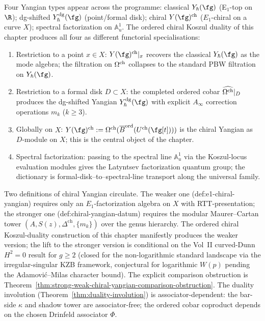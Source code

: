 \begin{convention}
\label{conv:ordered-kd-core-yangian-types}
Four Yangian types appear across the programme: classical
$Y_\hbar(\fg)$ (E$_1$-top on $\R$); dg-shifted
$Y^{\mathrm{dg}}_\hbar(\fg)$ (point/formal disk); chiral
$Y(\fg)^{\mathrm{ch}}$ ($E_1$-chiral on a curve $X$); spectral
factorization on $\mathbb{A}^1_u$. The ordered chiral Koszul
duality of this chapter produces all four as different functorial
specialisations:
\begin{enumerate}[label=\textup{(\arabic*)}]
\item Restriction to a point $x\in X$: $Y(\fg)^{\mathrm{ch}}|_x$
recovers the classical $Y_\hbar(\fg)$ as the mode algebra; the
filtration on $\Omega^{\mathrm{ch}}$ collapses to the standard PBW filtration
on $Y_\hbar(\fg)$.
\item Restriction to a formal disk $D\subset X$: the completed
ordered cobar $\widehat{\Omega^{\mathrm{ch}}}|_D$ produces the dg-shifted
Yangian $Y^{\mathrm{dg}}_\hbar(\fg)$ with explicit $A_\infty$
correction operations $m_k$ ($k\ge 3$).
\item Globally on $X$: $Y(\fg)^{\mathrm{ch}} :=
\Cobar(\Barchord(U^{\mathrm{ch}}(\fg[t])))$ is the chiral
Yangian as $D$-module on $X$; this is the central object of the
chapter.
\item Spectral factorization: passing to the spectral line
$\mathbb{A}^1_u$ via the Koszul-locus evaluation modules gives the
Latyntsev factorization quantum group; the dictionary is
formal-disk--to--spectral-line transport along the universal
family.
\end{enumerate}
\end{convention}

\begin{remark}
\label{rem:ordered-kd-core-two-definitions}
Two definitions of chiral Yangian circulate. The weaker one
(def:e1-chiral-yangian) requires only an $E_1$-factorization
algebra on $X$ with RTT-presentation; the stronger one
(def:chiral-yangian-datum) requires the modular Maurer--Cartan
tower $(A, S(z), \Delta^{\mathrm{ch}}, \{m_k\})$ over the genus
hierarchy. The ordered chiral Koszul-duality construction of this
chapter manifestly produces the weaker version; the lift to the
stronger version is conditional on the Vol~II curved-Dunn $H^2=0$
result for $g\ge 2$ (closed for the non-logarithmic standard
landscape via the irregular-singular KZB framework, conjectural for
logarithmic $W(p)$ pending the Adamovi\'c--Milas character bound).
The explicit comparison obstruction is
Theorem~\ref{thm:strong-weak-chiral-yangian-comparison-obstruction}.
The duality involution (Theorem~\ref{thm:duality-involution}) is
associator-dependent: the bar-side $\kappa$ and shadow tower are
associator-free; the ordered cobar coproduct depends on the chosen
Drinfeld associator $\Phi$.
\end{remark}

